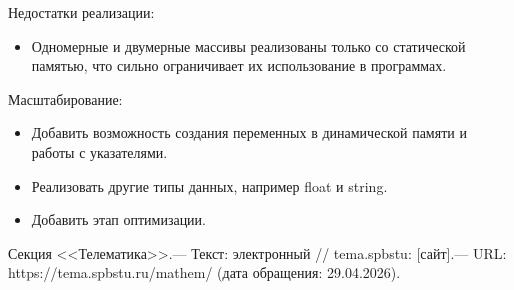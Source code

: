 \documentclass[a4paper,final]{article}
\begin{document}
Недостатки реализации:
\begin{itemize}
    \item Одномерные и двумерные массивы реализованы только со статической памятью, что сильно ограничивает их использование в программах.
\end{itemize}

Масштабирование:
\begin{itemize}
    \item Добавить возможность создания переменных в динамической памяти и работы с указателями.
    \item Реализовать другие типы данных, например float и string.
    \item Добавить этап оптимизации.
\end{itemize}

\newpage
{}
\begin{thebibliography}{}
     Секция <<Телематика>>.— Текст: электронный // tema.spbstu: [сайт].— URL: https://tema.spbstu.ru/mathem/ (дата обращения: 29.04.2026).
\end{thebibliography}

\newpage
\end{document}
